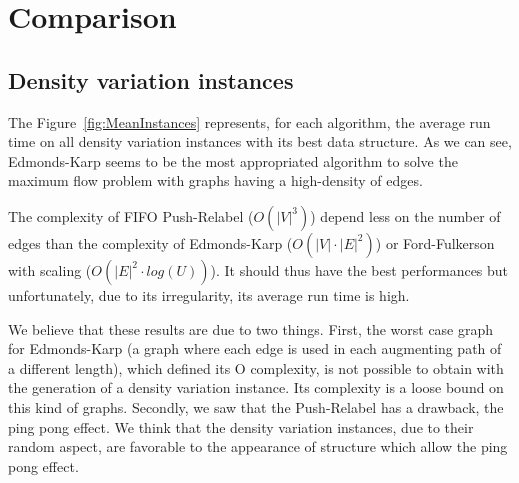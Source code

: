 

\section{Comparison}


\subsection{Density variation instances}
The Figure~\ref{fig:MeanInstances} represents, for each algorithm, the average run time on all density variation instances with its best data structure. As we can see, Edmonds-Karp seems to be the most appropriated algorithm to solve the maximum flow problem with graphs having a high-density of edges.

The complexity of FIFO Push-Relabel ($O(|V|^3)$) depend less on the number of edges than the complexity of Edmonds-Karp ($O(|V|\cdot |E|^2)$) or Ford-Fulkerson with scaling ($O(|E|^2 \cdot log(U))$). It should thus have the best performances but unfortunately, due to its irregularity, its average run time is high.

We believe that these results are due to two things. First, the worst case graph for Edmonds-Karp (a graph where each edge is used in each augmenting path of a different length), which defined its O complexity, is not possible to obtain with the generation of a density variation instance. Its complexity is a loose bound on this kind of graphs. Secondly, we saw that the Push-Relabel has a drawback, the ping pong effect. We think that the density variation instances, due to their random aspect, are favorable to the appearance of structure which allow the ping pong effect.

